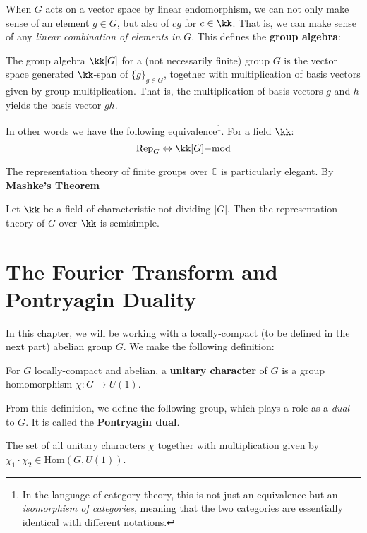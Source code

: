 		
		When $G$ acts on a vector space by linear endomorphism, we can not only make sense of an element $g \in G$, but also of $c g$ for $c \in \kk$. That is, we can make sense of any \emph{linear combination of elements in $G$}. This defines the \textbf{group algebra}:
		\begin{defn}
			The group algebra $\kk[G]$ for a (not necessarily finite) group $G$ is the vector space generated $\kk$-span of $\{g\}_{g \in G}$, together with multiplication of basis vectors given by group multiplication. That is, the multiplication of basis vectors $g$ and $h$ yields the basis vector $gh$.
		\end{defn}
		
		
		
		In other words we have the following equivalence\footnote{In the language of category theory, this is not just an equivalence but an \emph{isomorphism of categories}, meaning that the two categories are essentially identical with different notations.}. For a field $\kk$:
		\begin{equation*}
			\mathrm{Rep}_G \leftrightarrow \kk[G]\mathrm{-mod}
		\end{equation*}
		
		
		The representation theory of finite groups over $\mathbb C$ is particularly elegant. By \textbf{Mashke's Theorem}
		\begin{theorem}[Mashke]
			Let $\kk$ be a field of characteristic not dividing $|G|$. Then the representation theory of $G$ over $\kk$ is semisimple.
		\end{theorem}
		
		
		\section{The Fourier Transform and Pontryagin Duality} %
		\label{sec:the_fourier_transform_and_pontryagin_duality}
		
		In this chapter, we will be working with a locally-compact (to be defined in the next part) abelian group $G$. We make the following definition:
		\begin{defn}
			For $G$ locally-compact and abelian, a \textbf{unitary character} of $G$ is a group homomorphism $\chi: G \to U(1)$.
		\end{defn}
		From this definition, we define the following group, which plays a role as a \emph{dual} to $G$. It is called the \textbf{Pontryagin dual}.
		\begin{defn}
			The set of all unitary characters $\chi$ together with multiplication given by $\chi_1 \cdot \chi_2 \in \mathrm{Hom}(G, U(1))$.
		\end{defn}
		
